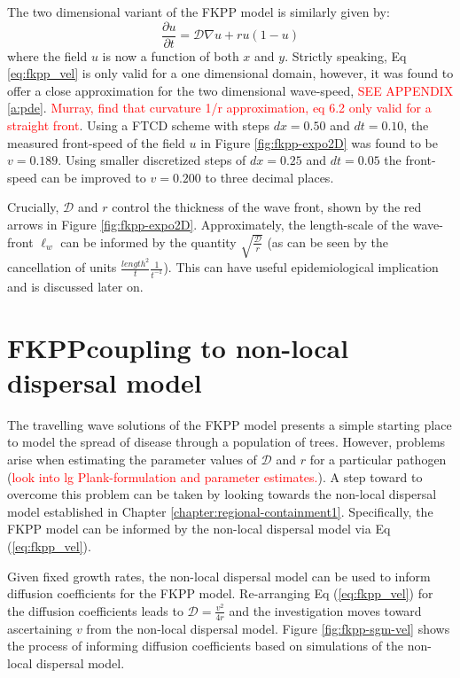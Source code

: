 The two dimensional variant of the FKPP model is similarly given by:
\begin{equation}
    \frac{\partial u}{\partial t} = \mathcal{D}\nabla u + ru(1 - u)
\end{equation}
where the field $u$ is now a function of both $x$ and $y$. %
Strictly speaking, Eq \ref{eq:fkpp_vel} is only valid for a one dimensional domain, however, it was found to offer a close approximation for the two dimensional wave-speed,  \textcolor{red}{SEE APPENDIX \ref{a:pde}}. %
\textcolor{red}{Murray, find that curvature 1/r approximation, eq 6.2 only valid for a straight front}. %
Using a FTCD scheme with steps $dx = 0.50$ and $dt = 0.10$, the measured front-speed of the field $u$ in Figure \ref{fig:fkpp-expo2D} was found to be $v=0.189$. %
Using smaller discretized steps of $dx = 0.25$ and $dt = 0.05$ the front-speed can be improved to $v=0.200$ to three decimal places.

Crucially, $\mathcal{D}$ and $r$ control the thickness of the wave front, shown by the red arrows in Figure \ref{fig:fkpp-expo2D}. %
Approximately, the length-scale of the wave-front $\ell_{w}$ can be informed by the quantity $\sqrt{ \frac{\mathcal{D}}{r}}$ (as can be seen by the cancellation of units $\frac{length^2}{t} \frac{1}{t^{-1}}$). %
This can have useful epidemiological implication and is  discussed later on. 

\section{FKPP\textemdash coupling to non-local dispersal model}

The travelling wave solutions of the FKPP model presents a simple starting place to model the spread of disease through a population of trees. %
However, problems arise when estimating the parameter values of $\mathcal{D}$ and $r$ for a particular pathogen (\textcolor{red}{look into lg Plank-formulation and parameter estimates.}). %
A step toward to overcome this problem %
can be taken by looking towards the non-local dispersal model established in Chapter \ref{chapter:regional-containment1}. %
Specifically, the FKPP model can be informed by the non-local dispersal model via Eq (\ref{eq:fkpp_vel}).

Given fixed growth rates, the non-local dispersal model can be used to inform diffusion coefficients for the FKPP model. %
Re-arranging Eq (\ref{eq:fkpp_vel}) for the diffusion coefficients leads to $\mathcal{D} = \frac{v^2}{4r}$ and the %
investigation moves toward ascertaining $v$ from the non-local dispersal model. %
Figure \ref{fig:fkpp-sgm-vel} shows the process of informing diffusion coefficients based on simulations of the non-local dispersal model. 

